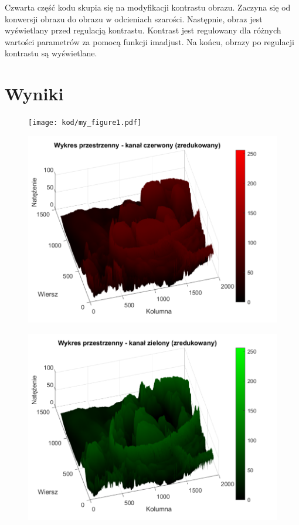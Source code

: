 \documentclass[10pt,a4paper,twoside,twocolumn]{article}%
\begin{document}
Czwarta część kodu skupia się na modyfikacji kontrastu obrazu. Zaczyna się od konwersji obrazu do obrazu w odcieniach szarości. Następnie, obraz jest wyświetlany przed regulacją kontrastu. Kontrast jest regulowany dla różnych wartości parametrów za pomocą funkcji imadjust. Na końcu, obrazy po regulacji kontrastu są wyświetlane.

\section{Wyniki}

\begin{figure}[H]
    \centering\texttt{[image: kod/my\_figure1.pdf]}
    \label{fig:my_figure1.pdf}
\end{figure}

\begin{figure}[H]\centering\includegraphics[width=0.9\linewidth]{kod/my_figure2.pdf}\label{fig:my_figure2.pdf}\end{figure}

\begin{figure}[H]\centering\includegraphics[width=0.9\linewidth]{kod/my_figure3.pdf}\label{fig:my_figure3.pdf}\end{figure}
\end{document}
